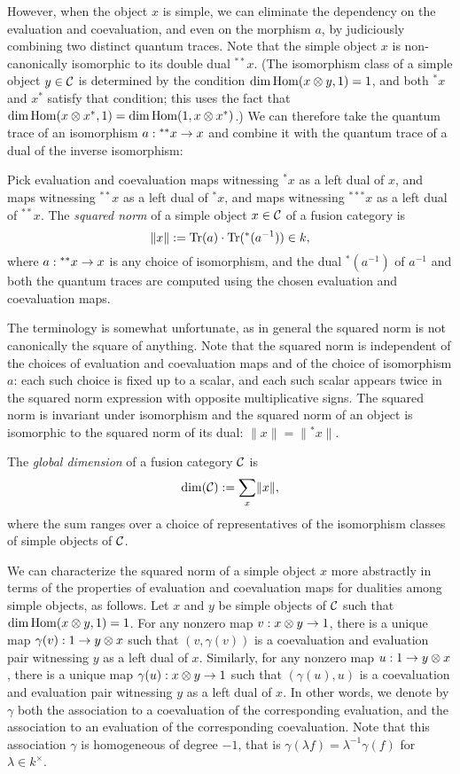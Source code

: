 \documentclass{amsart}
\begin{document}
However, when the object $x$ is simple, we can eliminate the dependency on the evaluation and coevaluation, and even on the morphism $a$, by judiciously combining two distinct quantum traces.  Note that the simple object $x$ is non-canonically isomorphic to its double dual ${}^{**} x$.  (The isomorphism class of a simple object $y \in \mathcal C$ is determined by the condition $\dim \operatorname{Hom}(x \otimes y,1) = 1$, and both ${}^* x$ and $x^*$ satisfy that condition; this uses the fact that $\dim \operatorname{Hom}(x \otimes x^*,1) = \dim \operatorname{Hom}(1, x \otimes x^*)$.)  We can therefore take the quantum trace of an isomorphism $a: {}^{**} x \rightarrow x$ and combine it with the quantum trace of a dual of the inverse isomorphism:
\begin{definition}
Pick evaluation and coevaluation maps witnessing ${}^* x$ as a left dual of $x$, and maps witnessing ${}^{**} x$ as a left dual of ${}^* x$, and maps witnessing ${}^{***} x$ as a left dual of ${}^{**} x$.  The \emph{squared norm} of a simple object $x \in \mathcal C$ of a fusion category is
\[
\lVert x \rVert := \mathrm{Tr}(a) \cdot \mathrm{Tr}({}^*(a^{-1})) \in k,
\]
where $a: {}^{**} x \rightarrow x$ is any choice of isomorphism, and the dual ${}^*(a^{-1})$ of $a^{-1}$ and both the quantum traces are computed using the chosen evaluation and coevaluation maps.
\end{definition}
\nid The terminology is somewhat unfortunate, as in general the squared norm is not canonically the square of anything.  Note that the squared norm is independent of the choices of evaluation and coevaluation maps and of the choice of isomorphism $a$: each such choice is fixed up to a scalar, and each such scalar appears twice in the squared norm expression with opposite multiplicative signs.  The squared norm is invariant under isomorphism and the squared norm of an object is isomorphic to the squared norm of its dual: $\lVert x \rVert = \lVert {}^* x \rVert$.
\begin{definition}
The \emph{global dimension} of a fusion category $\mathcal C$ is
\[
\dim(\mathcal C) := \sum_{x} \lVert x \rVert,
\]
where the sum ranges over a choice of representatives of the isomorphism classes of simple objects of $\mathcal C$.
\end{definition}

We can characterize the squared norm of a simple object $x$ more abstractly in terms of the properties of evaluation and coevaluation maps for dualities among simple objects, as follows.  Let $x$ and $y$ be simple objects of $\mathcal C$ such that $\dim \operatorname{Hom}(x \otimes y,1)=1$.  For any nonzero map $v: x \otimes y \rightarrow 1$, there is a unique map $\gamma(v): 1 \rightarrow y \otimes x$ such that $(v,\gamma(v))$ is a coevaluation and evaluation pair witnessing $y$ as a left dual of $x$.  Similarly, for any nonzero map $u: 1 \rightarrow y \otimes x$, there is a unique map $\gamma(u): x \otimes y \rightarrow 1$ such that $(\gamma(u),u)$ is a coevaluation and evaluation pair witnessing $y$ as a left dual of $x$.  In other words, we denote by $\gamma$ both the association to a coevaluation of the corresponding evaluation, and the association to an evaluation of the corresponding coevaluation.  Note that this association $\gamma$ is homogeneous of degree $-1$, that is $\gamma(\lambda f) = \lambda^{-1} \gamma(f)$ for $\lambda \in k^\times$.  
\end{document}
